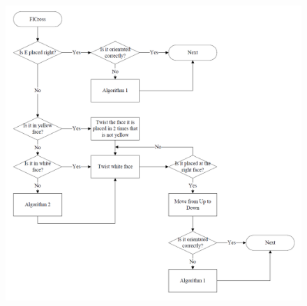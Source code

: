 \begin{figure}[htbp]
	\centering
		\includegraphics[width = \textwidth]{input/pics/FlCrossFlow3.png}
	\caption{}
	\label{fig:FlCrossFlow}
\end{figure}
